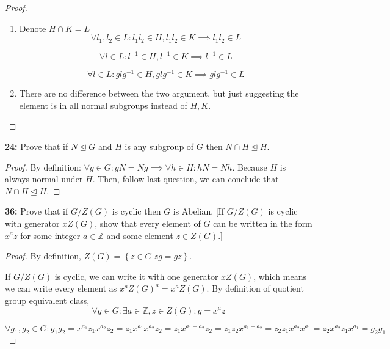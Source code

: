 \documentclass[11pt]{article}
\newcommand{\Z}{\mathbb{Z}}
\newenvironment{exercise}[1]
	{\noindent \textbf{#1:}}
	{\par \vspace{0.5\baselineskip}}
\begin{document}
\begin{proof}
	\begin{enumerate}[label=\emph{\alph*}]
		\item Denote $H \cap K = L$
		      \[
			      \forall l_1, l_2 \in L: l_1l_2 \in H, l_1l_2 \in K \implies l_1l_2 \in L
		      \]

		      \[
			      \forall l \in L: l^{-1} \in H, l^{-1} \in K \implies l^{-1} \in L
		      \]

		      \[
			      \forall l \in L: glg^{-1} \in H, glg^{-1} \in K \implies glg^{-1} \in L
		      \]
		\item There are no difference between the two argument, but just suggesting the element is in all normal subgroups instead of $H,K$.
	\end{enumerate}
\end{proof}

\begin{exercise}{24}
	\textsf{Prove that if \(N \trianglelefteq G\) and \(H\) is any subgroup of \(G\) then \(N \cap H \trianglelefteq H\).}
\end{exercise}{}

\begin{proof}
	By definition: $\forall g \in G: gN=Ng \implies \forall h \in H: hN=Nh$.
	Because $H$ is always normal under $H$.
	Then, follow last question, we can conclude that $N \cap H \trianglelefteq H$.
\end{proof}

\begin{exercise}{36}
	Prove that if \(G/Z(G)\) is cyclic then \(G\) is Abelian. [If \(G/Z(G)\) is cyclic with generator \(xZ(G)\), show that every element of \(G\) can be written in the form \(x^{a}z\) for some integer \(a \in \mathbb{Z}\) and some element \(z \in Z(G)\).]
\end{exercise}{}

\begin{proof}
	By definition, $Z(G) = \left\{ z \in G | zg = gz \right\}$.

	If ${G} / Z(G)$ is cyclic, we can write it with one generator $xZ(G)$, which means
	we can write every element as $x^aZ(G)^a=x^aZ(G)$.
	By definition of quotient group equivalent class,
	\[
		\forall g \in G: \exists a \in \Z, z \in Z(G) : g = x^az
	\]

	\[
		\forall g_1,g_2 \in G: g_1g_2 = x^{a_1}z_1x^{a_2}z_2 = z_1x^{a_1}x^{a_2}z_2=z_1x^{a_1+a_2}z_2=z_1z_2x^{a_1+a_2}=z_2z_1x^{a_2}x^{a_1}=z_2x^{a_2}z_1x^{a_1}=g_2g_1
	\]
\end{proof}
\end{document}
